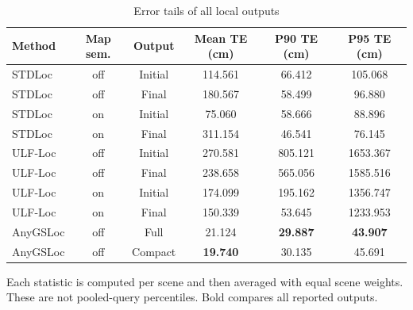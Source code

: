 \begin{table}[tp]
\centering
\footnotesize
\setlength{\tabcolsep}{4pt}
\renewcommand{\arraystretch}{1.12}
\caption{Error tails of all local outputs}
\label{tab:s_baseline_tails}
\begin{tabular}{lccccc}
\toprule
Method & Map sem. & Output & Mean TE (cm) & P90 TE (cm) & P95 TE (cm) \\
\midrule
STDLoc & off & Initial & 114.561 & 66.412 & 105.068 \\
STDLoc & off & Final & 180.567 & 58.499 & 96.880 \\
STDLoc & on & Initial & 75.060 & 58.666 & 88.896 \\
STDLoc & on & Final & 311.154 & 46.541 & 76.145 \\
ULF-Loc & off & Initial & 270.581 & 805.121 & 1653.367 \\
ULF-Loc & off & Final & 238.658 & 565.056 & 1585.516 \\
ULF-Loc & on & Initial & 174.099 & 195.162 & 1356.747 \\
ULF-Loc & on & Final & 150.339 & 53.645 & 1233.953 \\
AnyGSLoc & off & Full & 21.124 & \textbf{29.887} & \textbf{43.907} \\
AnyGSLoc & off & Compact & \textbf{19.740} & 30.135 & 45.691 \\
\bottomrule
\end{tabular}
\par\smallskip\begin{minipage}{0.98\linewidth}\footnotesize Each statistic is computed per scene and then averaged with equal scene weights. These are not pooled-query percentiles. Bold compares all reported outputs.\end{minipage}
\end{table}
